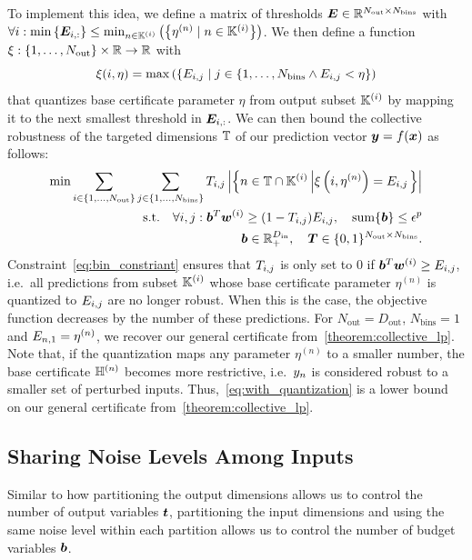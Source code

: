 To implement this idea, we define a matrix of thresholds ${\bm{E}} \in {\mathbb{R}}^{N_\mathrm{out} \times N_\mathrm{bins}}$ with
$\forall i: \min\left\{{\bm{E}}_{i,:}\right\} \leq \min_{n \in {\mathbb{K}}^{(i)}}\left(\left\{\eta^{(n)} \mid n \in {\mathbb{K}}^{(i)} \right\}\right)$.
We then define a function $\xi : \{1,\dots,N_\mathrm{out}\} \times {\mathbb{R}} \rightarrow {\mathbb{R}}$ with
\begin{equation}
\xi(i, \eta) = \max\left( \left\{ {E}_{i, j} \mid j \in \{1,\dots,N_\mathrm{bins} \land {E}_{i, j} < \eta \right\} \right)
\end{equation}
that quantizes base certificate parameter $\eta$ from output subset ${\mathbb{K}}^{(i)}$ by mapping it to the next smallest threshold in ${\bm{E}}_{i,:}$.
We can then bound the collective robustness of the targeted dimensions ${\mathbb{T}}$ of our prediction vector ${\bm{y}} = f({\bm{x}})$ as follows:
\begin{align}\label{eq:with_quantization}
    \min
    \sum_{i \in \{1,\dots,N_\mathrm{out}\}} 
    \sum_{j \in \{1,\dots,N_\mathrm{bins}\}}
    {T}_{i,j}
    \left|
    \left\{
        n \in {\mathbb{T}} \cap {\mathbb{K}}^{(i)} \left| \xi\left(i, \eta^{(n)}\right) = {E}_{i,j} \right.
    \right\}
    \right|
    \\\label{eq:bin_constriant}
    \text{s.t.} \quad
        \forall i, j: 
        {\bm{b}}^T {\bm{w}}^{(i)}  \geq (1 - {T}_{i,j}) {E}_{i,j}, 
    \quad
    \mathrm{sum}\{{\bm{b}}\} \leq \epsilon^p
    \\
    {\bm{b}} \in {\mathbb{R}}_+^{D_\mathrm{in}}, \quad {\bm{T}} \in \{0,1\}^{N_\mathrm{out} \times N_\mathrm{bins}}.
\end{align}
Constraint~\autoref{eq:bin_constriant} ensures that ${T}_{i,j}$ is only set to $0$ if ${\bm{b}}^T {\bm{w}}^{(i)} \geq {E}_{i,j}$, i.e.~all predictions from subset ${\mathbb{K}}^{(i)}$ whose base certificate parameter $\eta^{(n)}$ is quantized to ${E}_{i,j}$ are no longer robust.
When this is the case, the objective function decreases by the number of these predictions.
For $N_\mathrm{out} = D_\mathrm{out}$, $N_\mathrm{bins}=1$ and ${E}_{n,1} = \eta^{(n)}$, we recover our general certificate from~\autoref{theorem:collective_lp}.
Note that, if the quantization maps any parameter $\eta^{(n)}$ to a smaller number, the base certificate ${\mathbb{H}}^{(n)}$ becomes more restrictive, i.e.~${y}_n$ is considered robust to a smaller set of perturbed inputs. Thus,~\autoref{eq:with_quantization} is a lower bound on our general certificate from~\autoref{theorem:collective_lp}.

\subsection{Sharing Noise Levels Among Inputs}\label{section:sharing_input_noise}
Similar to how partitioning the output dimensions allows us to control the number of output variables ${\bm{t}}$, partitioning the input dimensions and using the same noise level within each partition allows us to control the number of budget variables  ${\bm{b}}$.

